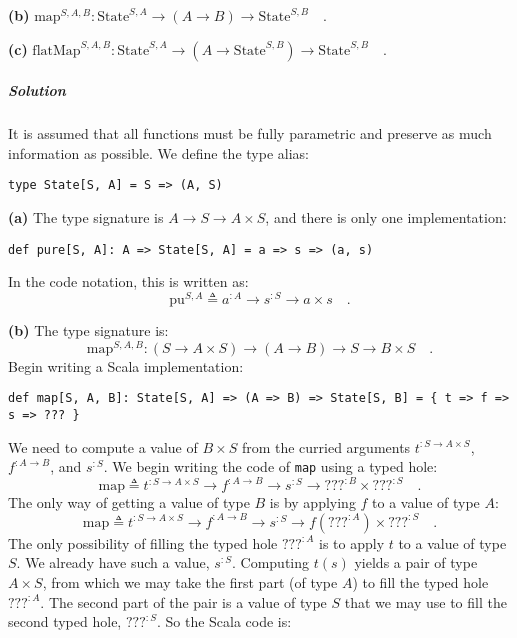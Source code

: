 \textbf{(b)} $\text{map}^{S,A,B}:\text{State}^{S,A}\rightarrow(A\rightarrow B)\rightarrow\text{State}^{S,B}\quad.$

\textbf{(c)} $\text{flatMap}^{S,A,B}:\text{State}^{S,A}\rightarrow(A\rightarrow\text{State}^{S,B})\rightarrow\text{State}^{S,B}\quad.$

\subparagraph{Solution}

It is assumed that all functions must be fully parametric and preserve
as much information as possible. We define the type alias:
\begin{lstlisting}
type State[S, A] = S => (A, S)
\end{lstlisting}

\textbf{(a)} The type signature is $A\rightarrow S\rightarrow A\times S$,
and there is only one implementation:
\begin{lstlisting}
def pure[S, A]: A => State[S, A] = a => s => (a, s)
\end{lstlisting}
In the code notation, this is written as:
\[
\text{pu}^{S,A}\triangleq a^{:A}\rightarrow s^{:S}\rightarrow a\times s\quad.
\]

\textbf{(b)} The type signature is:
\[
\text{map}^{S,A,B}:(S\rightarrow A\times S)\rightarrow(A\rightarrow B)\rightarrow S\rightarrow B\times S\quad.
\]
Begin writing a Scala implementation:
\begin{lstlisting}
def map[S, A, B]: State[S, A] => (A => B) => State[S, B] = { t => f => s => ??? }
\end{lstlisting}
We need to compute a value of $B\times S$ from the curried arguments
$t^{:S\rightarrow A\times S}$, $f^{:A\rightarrow B}$, and $s^{:S}$.
We begin writing the code of \lstinline!map! using a typed hole:
\[
\text{map}\triangleq t^{:S\rightarrow A\times S}\rightarrow f^{:A\rightarrow B}\rightarrow s^{:S}\rightarrow\text{???}^{:B}\times\text{???}^{:S}\quad.
\]
The only way of getting a value of type $B$ is by applying $f$ to
a value of type $A$:
\[
\text{map}\triangleq t^{:S\rightarrow A\times S}\rightarrow f^{:A\rightarrow B}\rightarrow s^{:S}\rightarrow f(\text{???}^{:A})\times\text{???}^{:S}\quad.
\]
The only possibility of filling the typed hole $\text{???}^{:A}$
is to apply $t$ to a value of type $S$. We already have such a value,
$s^{:S}$. Computing $t(s)$ yields a pair of type $A\times S$, from
which we may take the first part (of type $A$) to fill the typed
hole $\text{???}^{:A}$. The second part of the pair is a value of
type $S$ that we may use to fill the second typed hole, $\text{???}^{:S}$.
So the Scala code is:

